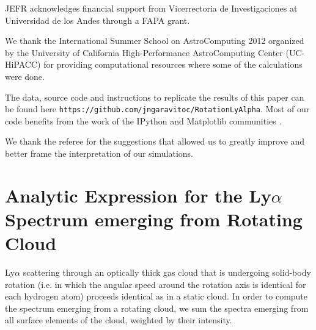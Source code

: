 \documentclass{emulateapj}
\begin{document}
JEFR acknowledges financial support from Vicerrectoria de
Investigaciones at Universidad de los Andes through a FAPA grant.

We thank the International Summer School on AstroComputing
2012 organized by the University of California High-Performance
AstroComputing Center (UC-HiPACC) for providing computational
resources where some of the calculations were done. 

The data, source code and instructions to
replicate the results of this paper can be found
here {\texttt{https://github.com/jngaravitoc/RotationLyAlpha}}.
Most of our code benefits from the work of the IPython and Matplotlib
communities \citep{IPython,matplotlib}.

We thank the referee for the suggestions that allowed us to greatly
improve and better frame the interpretation of our simulations. 


\appendix
\section{Analytic Expression for the Ly$\alpha$ Spectrum
  emerging from Rotating Cloud}  


Ly$\alpha$ scattering through an optically thick gas cloud that is
undergoing solid-body rotation (i.e. in which the angular speed around the
rotation axis is identical for each hydrogen atom) proceeds identical
as in a static cloud. In order to compute the spectrum emerging from a rotating cloud, we sum
the spectra emerging from all surface elements of the cloud, weighted by their intensity.  
\end{document}
